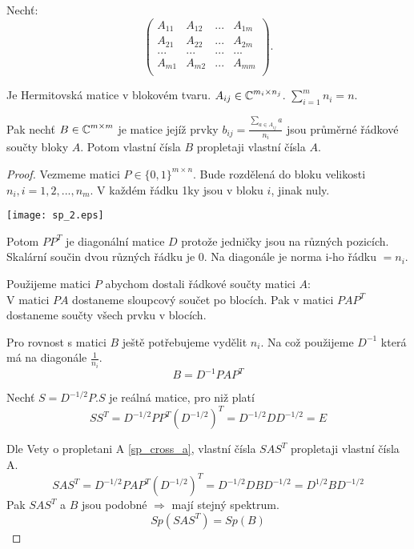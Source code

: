 \begin{theorem}[Propletani B]\label{sp_cross_b}
	Nechť:
	\[
	\begin{pmatrix}
		A_{11} & A_{12} & ... & A_{1m}\\
		A_{21} & A_{22} & ... & A_{2m}\\
		... & ... & ... & ... \\
		A_{m1} & A_{m2} & ... & A_{mm}\\
	\end{pmatrix}.
\]

	Je Hermitovská matice v blokovém tvaru. $A_{ij} \in \operatorname{\mathbb{C}}^{m_i \times n_j}$.
	$\sum_{i=1}^m n_i = n$.

	Pak nechť $B \in \operatorname{\mathbb{C}}^{m \times m}$ je matice jejíž prvky $b_{ij} = \frac{\sum_{a \in A_{ij}} a}{n_i} $ jsou průměrné řádkové součty bloky $A$.
	Potom vlastní čísla $B$ propletaji vlastní čísla $A$.
\end{theorem}
\begin{proof}
	Vezmeme matici $P \in \{0, 1\}^{m \times n}$. Bude rozdělená do bloku velikosti $n_i, i = 1,2,...,n_m$.
	V každém řádku 1ky jsou v bloku $i$, jinak nuly.

	\texttt{[image: sp\_2.eps]}

	Potom $PP^T$ je diagonální matice $D$ protože jedničky jsou na různých pozicích. Skalární součin dvou různých řádku je 0.
	Na diagonále je norma i-ho řádku $= n_i$.

	Použijeme matici $P$ abychom dostali řádkové součty matici $A$:\\
	V matici $PA$ dostaneme sloupcový součet po blocích. Pak v matici $PAP^T$ dostaneme součty všech prvku v blocích.

	Pro rovnost s matici $B$ ještě potřebujeme vydělit $n_i$. Na což použijeme $D^{-1}$ která má na diagonále $\frac{1}{n_i}$.
	\[ B = D^{-1}PAP^T \]

	Nechť $S = D^{-1/2}P. S$ je reálná matice, pro niž platí
	\[ SS^T = D^{-1/2}PP^T(D^{-1/2})^T = D^{-1/2}DD^{-1/2} = E \]

	Dle Vety o propletani A \cref{sp_cross_a}, vlastní čísla $SAS^T$ propletaji vlastní čísla A.
	\[ SAS^T = D^{-1/2}PAP^T(D^{-1/2})^T = D^{-1/2}DBD^{-1/2} = D^{1/2}BD^{-1/2} \]
	Pak $SAS^T$ a $B$ jsou podobné $\Rightarrow$ mají stejný spektrum.
	\[ Sp(SAS^T) = Sp(B) \]
\end{proof}

